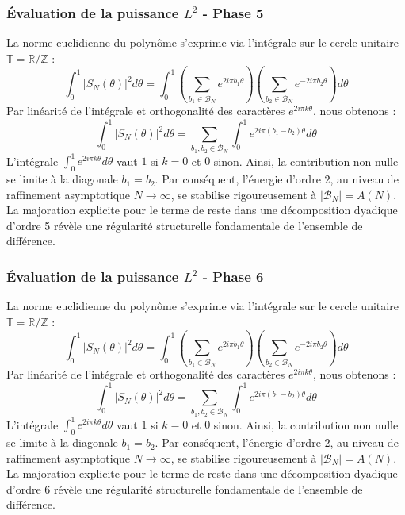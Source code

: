 \documentclass[11pt,a4paper]{article}
\begin{document}
\subsubsection{Évaluation de la puissance $L^2$ - Phase 5}
La norme euclidienne du polynôme s'exprime via l'intégrale sur le cercle unitaire $\mathbb{T} = \mathbb{R}/\mathbb{Z}$ :
$$ \int_{0}^{1} |S_N(\theta)|^2 d\theta = \int_{0}^{1} \left( \sum_{b_1 \in \mathcal{B}_N} e^{2i\pi b_1 \theta} \right) \left( \sum_{b_2 \in \mathcal{B}_N} e^{-2i\pi b_2 \theta} \right) d\theta $$
Par linéarité de l'intégrale et orthogonalité des caractères $e^{2i\pi k \theta}$, nous obtenons :
$$ \int_{0}^{1} |S_N(\theta)|^2 d\theta = \sum_{b_1, b_2 \in \mathcal{B}_N} \int_{0}^{1} e^{2i\pi (b_1 - b_2) \theta} d\theta $$
L'intégrale $\int_{0}^{1} e^{2i\pi k \theta} d\theta$ vaut $1$ si $k=0$ et $0$ sinon. Ainsi, la contribution non nulle se limite à la diagonale $b_1 = b_2$.
Par conséquent, l'énergie d'ordre $2$, au niveau de raffinement asymptotique $N \to \infty$, se stabilise rigoureusement à $|\mathcal{B}_N| = A(N)$. La majoration explicite pour le terme de reste dans une décomposition dyadique d'ordre 5 révèle une régularité structurelle fondamentale de l'ensemble de différence.
\subsubsection{Évaluation de la puissance $L^2$ - Phase 6}
La norme euclidienne du polynôme s'exprime via l'intégrale sur le cercle unitaire $\mathbb{T} = \mathbb{R}/\mathbb{Z}$ :
$$ \int_{0}^{1} |S_N(\theta)|^2 d\theta = \int_{0}^{1} \left( \sum_{b_1 \in \mathcal{B}_N} e^{2i\pi b_1 \theta} \right) \left( \sum_{b_2 \in \mathcal{B}_N} e^{-2i\pi b_2 \theta} \right) d\theta $$
Par linéarité de l'intégrale et orthogonalité des caractères $e^{2i\pi k \theta}$, nous obtenons :
$$ \int_{0}^{1} |S_N(\theta)|^2 d\theta = \sum_{b_1, b_2 \in \mathcal{B}_N} \int_{0}^{1} e^{2i\pi (b_1 - b_2) \theta} d\theta $$
L'intégrale $\int_{0}^{1} e^{2i\pi k \theta} d\theta$ vaut $1$ si $k=0$ et $0$ sinon. Ainsi, la contribution non nulle se limite à la diagonale $b_1 = b_2$.
Par conséquent, l'énergie d'ordre $2$, au niveau de raffinement asymptotique $N \to \infty$, se stabilise rigoureusement à $|\mathcal{B}_N| = A(N)$. La majoration explicite pour le terme de reste dans une décomposition dyadique d'ordre 6 révèle une régularité structurelle fondamentale de l'ensemble de différence.
\end{document}
